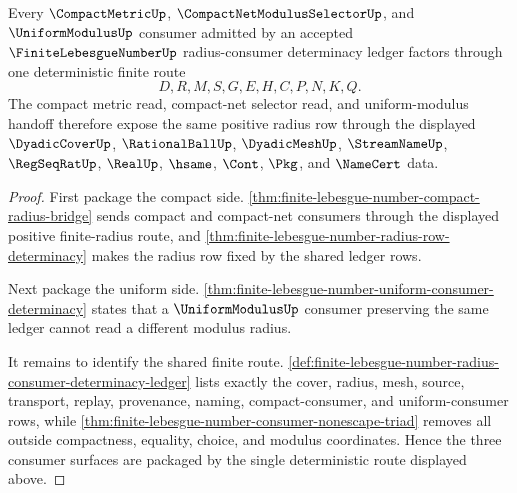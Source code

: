 \begin{theorem}
\label{thm:finite-lebesgue-number-compact-consumer-determinacy-package}
Every $\CompactMetricUp$, $\CompactNetModulusSelectorUp$, and $\UniformModulusUp$ consumer admitted by an accepted $\FiniteLebesgueNumberUp$ radius-consumer determinacy ledger factors through one deterministic finite route
$$
D,R,M,S,G,E,H,C,P,N,K,Q .
$$
The compact metric read, compact-net selector read, and uniform-modulus handoff therefore expose the same positive radius row through the displayed $\DyadicCoverUp$, $\RationalBallUp$, $\DyadicMeshUp$, $\StreamNameUp$, $\RegSeqRatUp$, $\RealUp$, $\hsame$, $\Cont$, $\Pkg$, and $\NameCert$ data.
\end{theorem}
\begin{proof}
First package the compact side. \autoref{thm:finite-lebesgue-number-compact-radius-bridge} sends compact and compact-net consumers through the displayed positive finite-radius route, and \autoref{thm:finite-lebesgue-number-radius-row-determinacy} makes the radius row fixed by the shared ledger rows.

Next package the uniform side. \autoref{thm:finite-lebesgue-number-uniform-consumer-determinacy} states that a $\UniformModulusUp$ consumer preserving the same ledger cannot read a different modulus radius.

It remains to identify the shared finite route. \autoref{def:finite-lebesgue-number-radius-consumer-determinacy-ledger} lists exactly the cover, radius, mesh, source, transport, replay, provenance, naming, compact-consumer, and uniform-consumer rows, while \autoref{thm:finite-lebesgue-number-consumer-nonescape-triad} removes all outside compactness, equality, choice, and modulus coordinates. Hence the three consumer surfaces are packaged by the single deterministic route displayed above.
\end{proof}
